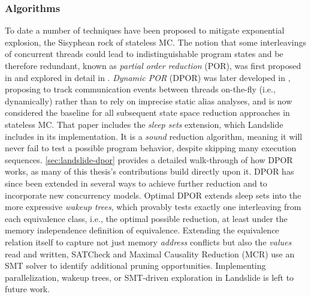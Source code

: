 \subsubsection{Algorithms}
\label{sec:related-algs}

To date a number of techniques have been proposed to mitigate exponential explosion,
the Sisyphean rock of stateless MC.
The notion that some interleavings of concurrent threads could lead to indistinguishable program states and be therefore redundant,
known as {\em partial order reduction} (POR),
was first proposed in \cite{partial-model-checking}
and explored in detail in \cite{partial-order-methods}.
{\em Dynamic POR} (DPOR) was later developed in \cite{dpor},
proposing to track communication events between threads on-the-fly (i.e., dynamically)
rather than to rely on imprecise static alias analyses,
and is now considered the baseline for all subsequent state space reduction approaches in stateless MC.
That paper includes the {\em sleep sets} extension,
which Landslide includes in its implementation.
It is a {\em sound} reduction algorithm, meaning it will never fail to test a possible program behavior, despite skipping many execution sequences.
\cref{sec:landslide-dpor} provides a detailed walk-through of how DPOR works,
as many of this thesis's contributions build directly upon it.
%
DPOR has since been extended in several ways to achieve further reduction
and to incorporate new concurrency models.
Optimal DPOR \cite{optimal-dpor} extends sleep sets into the more expressive {\em wakeup trees},
which provably tests exactly one interleaving from each equivalence class,
i.e., the optimal possible reduction,
at least under the memory independence definition of equivalence.
Extending the equivalence relation itself to capture not just memory {\em address} conflicts
but also the {\em values} read and written,
SATCheck \cite{satcheck} and Maximal Causality Reduction (MCR) \cite{mcr}
use an SMT solver \cite{z3} to identify additional pruning opportunities.
Implementing parallelization, wakeup trees, or SMT-driven exploration in Landslide is left to future work.

